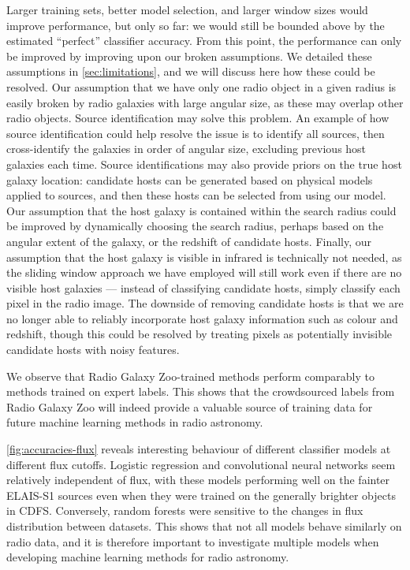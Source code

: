 \documentclass[fleqn,usenatbib,usedcolumn]{mnras}
\begin{document}
  Larger training sets, better model selection, and larger window sizes
  would improve performance, but only so far: we would still be bounded
  above by the estimated ``perfect'' classifier accuracy. From this point,
  the performance can only be improved by improving upon our broken
  assumptions. We detailed these assumptions in \autoref{sec:limitations},
  and we will discuss here how these could be resolved. Our assumption that
  we have only one radio object in a given radius is easily broken by radio
  galaxies with large angular size, as these may overlap other radio
  objects. Source identification may solve this problem. An example of how
  source identification could help resolve the issue is to identify all
  sources, then cross-identify the galaxies in order of angular size,
  excluding previous host galaxies each time. Source identifications may
  also provide priors on the true host galaxy location: candidate hosts can
  be generated based on physical models applied to sources, and then these
  hosts can be selected from using our model. Our assumption that the host
  galaxy is contained within the search radius could be improved by
  dynamically choosing the search radius, perhaps based on the angular
  extent of the galaxy, or the redshift of candidate hosts. Finally, our
  assumption that the host galaxy is visible in infrared is technically not
  needed, as the sliding window approach we have employed will still work
  even if there are no visible host galaxies --- instead of classifying
  candidate hosts, simply classify each pixel in the radio image. The
  downside of removing candidate hosts is that we are no longer able to
  reliably incorporate host galaxy information such as colour and redshift,
  though this could be resolved by treating pixels as potentially invisible
  candidate hosts with noisy features.

  We observe that Radio Galaxy Zoo-trained methods perform comparably to
  methods trained on expert labels. This shows that the crowdsourced labels
  from Radio Galaxy Zoo will indeed provide a valuable source of training
  data for future machine learning methods in radio astronomy.

  \autoref{fig:accuracies-flux} reveals interesting behaviour of different
  classifier models at different flux cutoffs. Logistic regression and
  convolutional neural networks seem relatively independent of flux, with
  these models performing well on the fainter ELAIS-S1 sources even when
  they were trained on the generally brighter objects in CDFS. Conversely,
  random forests were sensitive to the changes in flux distribution between
  datasets. This shows that not all models behave similarly on radio data,
  and it is therefore important to investigate multiple models when
  developing machine learning methods for radio astronomy.
\end{document}
